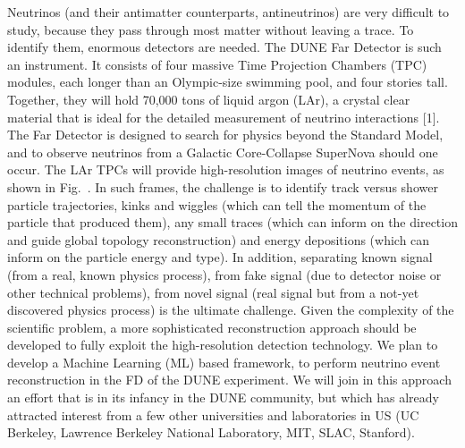 Neutrinos (and their antimatter counterparts, antineutrinos) are very difficult to study, because they pass through most matter without leaving a trace. To identify them, enormous detectors are needed. The DUNE Far Detector is such an instrument. It consists of four massive Time Projection Chambers (TPC) modules, each longer than an Olympic-size swimming pool, and four stories tall. Together, they will hold 70,000 tons of liquid argon (LAr), a crystal clear material that is ideal for the detailed measurement of neutrino interactions [1]. The Far Detector is designed to search for physics beyond the Standard Model, and to observe neutrinos from a Galactic Core-Collapse SuperNova should one occur. The LAr TPCs will provide high-resolution images of neutrino events, as shown in Fig.~. In such frames, the challenge is to identify track versus shower particle trajectories, kinks and wiggles (which can tell the momentum of the particle that produced them), any small traces (which can inform on the direction and guide global topology reconstruction) and energy depositions (which can inform on the particle energy and type). In addition, separating known signal (from a real, known physics process), from fake signal (due to detector noise or other technical problems), from novel signal (real signal but from a  not-yet discovered physics process) is the ultimate challenge. Given the complexity of the scientific problem, a more sophisticated reconstruction approach should be developed to fully exploit the high-resolution detection technology. We plan to develop a Machine Learning (ML) based framework, to perform neutrino event reconstruction in the FD of the DUNE experiment. We will join in this approach an effort that is in its infancy in the DUNE community, but which has already attracted interest from a few other universities and laboratories in US (UC Berkeley, Lawrence Berkeley National Laboratory, MIT, SLAC, Stanford). 
\vspace{-0.5cm}
